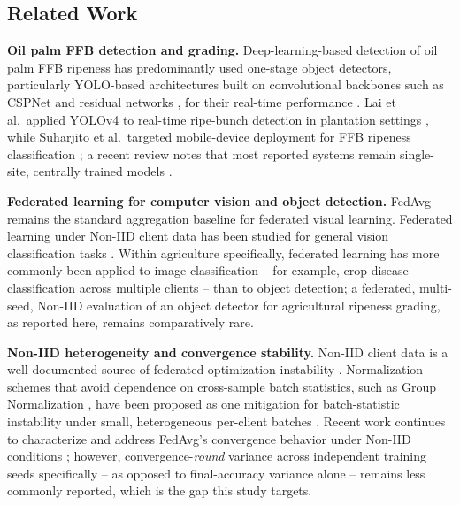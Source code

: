 \documentclass[11pt]{article}
\begin{document}
\subsection*{Related Work}
\textbf{Oil palm FFB detection and grading.} Deep-learning-based detection of oil palm FFB ripeness has predominantly used one-stage object detectors, particularly YOLO-based architectures built on convolutional backbones such as CSPNet \cite{wang2020cspnet} and residual networks \cite{he2016}, for their real-time performance \cite{lai2022,suharjito2021,suharjito2023dataset,asrol2023,goh2025}. Lai et al.\ applied YOLOv4 to real-time ripe-bunch detection in plantation settings \cite{lai2022}, while Suharjito et al.\ targeted mobile-device deployment for FFB ripeness classification \cite{suharjito2021}; a recent review notes that most reported systems remain single-site, centrally trained models \cite{goh2025}.

\textbf{Federated learning for computer vision and object detection.} FedAvg \cite{mcmahan2017fedavg} remains the standard aggregation baseline for federated visual learning. Federated learning under Non-IID client data has been studied for general vision classification tasks \cite{hsu2019,kairouz2021}. Within agriculture specifically, federated learning has more commonly been applied to image classification -- for example, crop disease classification across multiple clients \cite{kabala2023} -- than to object detection; a federated, multi-seed, Non-IID evaluation of an object detector for agricultural ripeness grading, as reported here, remains comparatively rare.

\textbf{Non-IID heterogeneity and convergence stability.} Non-IID client data is a well-documented source of federated optimization instability \cite{kairouz2021,hsu2019}. Normalization schemes that avoid dependence on cross-sample batch statistics, such as Group Normalization \cite{wu2018groupnorm}, have been proposed as one mitigation for batch-statistic instability under small, heterogeneous per-client batches \cite{li2021fedbn}. Recent work continues to characterize and address FedAvg's convergence behavior under Non-IID conditions \cite{interno2024}; however, convergence-\emph{round} variance across independent training seeds specifically -- as opposed to final-accuracy variance alone -- remains less commonly reported, which is the gap this study targets.
\end{document}
